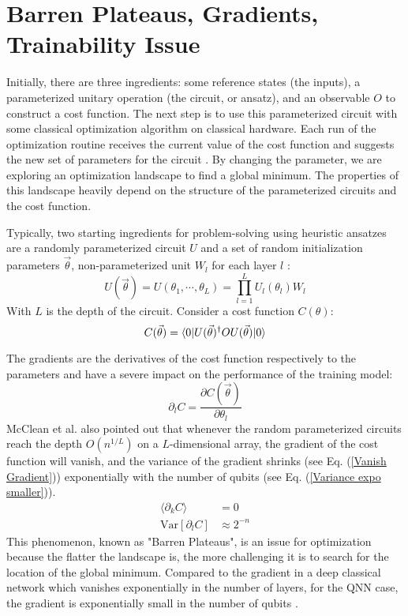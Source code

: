 \section{Barren Plateaus, Gradients, Trainability Issue}
Initially, there are three ingredients: some reference states (the inputs), a parameterized unitary operation (the circuit, or ansatz), and an observable $O$ to construct a cost function.
The next step is to use this parameterized circuit with some classical optimization algorithm on classical hardware.
Each run of the optimization routine receives the current value of the cost function and suggests the new set of parameters for the circuit \cite{cerezo2021variational}.
By changing the parameter, we are exploring an optimization landscape to find a global minimum.
The properties of this landscape heavily depend on the structure of the parameterized circuits and the cost function.

Typically, two starting ingredients for problem-solving using heuristic ansatzes are a randomly parameterized circuit $U$ and a set of random initialization parameters $\vec{\theta}$, non-parameterized unit $W_l$ for each layer $l$ \cite{mccleanBarrenPlateausQuantum2018}:
\begin{equation}\label{Parameterized Circuit}
    U(\vec{\theta})
    = U(\theta_1, \cdots, \theta_L)
    = \prod_{l=1}^L U_l(\theta_l)W_l
\end{equation}
With $L$ is the depth of the circuit. Consider a cost function $C(\theta)$:
\begin{equation}
    C(\vec{\theta})
    = \bra{0} U(\vec{\theta})^\dagger OU(\vec{\theta}) \ket{0}
\end{equation}

The gradients are the derivatives of the cost function respectively to the parameters and have a severe impact on the performance of the training model:
\begin{equation}
    \partial_l C = \frac{\partial C(\vec{\theta})}{\partial\theta_l}
\end{equation}
McClean et al.\cite{mccleanBarrenPlateausQuantum2018} also pointed out that whenever the random parameterized circuits reach the depth $O(n^{1/L})$ on a $L$-dimensional array, the gradient of the cost function will vanish, and the variance of the gradient shrinks (see Eq. (\ref{Vanish Gradient})) exponentially with the number of qubits (see Eq. (\ref{Variance expo smaller})).
\begin{align}
    \langle \partial_k C\rangle &= 0  \label{Vanish Gradient}\\
    \mathrm{Var}[\partial_l C] &\approx 2^{-n}  \label{Variance expo smaller}
\end{align}
This phenomenon, known as "Barren Plateaus", is an issue for optimization because the flatter the landscape is, the more challenging it is to search for the location of the global minimum.
Compared to the gradient in a deep classical network which vanishes exponentially in the number of layers, for the QNN case, the gradient is exponentially small in the number of qubits \cite{mccleanBarrenPlateausQuantum2018}.

